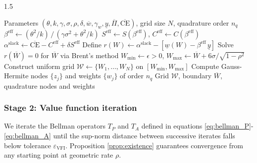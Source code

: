 \documentclass[12pt]{article}
\theoremstyle{definition}
\theoremstyle{plain}
\begin{document}
\begin{spacing}{1.5}
\begin{algorithm}[H]
\caption{Grid construction and regime identification}
\label{alg:grid}
\begin{algorithmic}[1]
\Require Parameters $(\theta, k, \gamma, \sigma, \rho, \delta,
         \overline{w}, \gamma_{w}, \underline{y},
         \overline{\Pi}, \overline{\text{CE}})$, grid size $N$,
         quadrature order $n_{q}$
\State $\beta^{\mathrm{eff}}
       \leftarrow (\theta^{2}/k)\,/\,(\gamma\sigma^{2}+\theta^{2}/k)$
\State $S^{\mathrm{eff}} \leftarrow S(\beta^{\mathrm{eff}})$,
       \quad $C^{\mathrm{eff}} \leftarrow C(\beta^{\mathrm{eff}})$
\State $\alpha^{\mathrm{slack}}
       \leftarrow \overline{\text{CE}} - C^{\mathrm{eff}} + \delta S^{\mathrm{eff}}$
\State Define $r(W)
       \leftarrow \alpha^{\mathrm{slack}}
       - [\underline{w}(W) - \beta^{\mathrm{eff}}\,\underline{y}]$
\State Solve $r(\overline{W}) = 0$ for $\overline{W}$ via Brent's method
\State $W_{\min} \leftarrow \epsilon > 0$,\quad
       $W_{\max} \leftarrow \overline{W}
       + 6\sigma/\!\sqrt{1-\rho^{2}}$
\State Construct uniform grid
       $\mathcal{W} \leftarrow \{W_{1}, \ldots, W_{N}\}$
       on $[W_{\min}, W_{\max}]$
\State Compute Gauss-Hermite nodes $\{z_{j}\}$ and weights $\{w_{j}\}$
       of order $n_{q}$
\Ensure Grid $\mathcal{W}$, boundary $\overline{W}$,
        quadrature nodes and weights
\end{algorithmic}
\end{algorithm}
 

 
\subsubsection*{Stage 2: Value function iteration}
 
We iterate the Bellman operators $T_{P}$ and $T_{A}$ defined in equations \eqref{eq:bellman_P}-\eqref{eq:bellman_A} until the sup-norm distance between successive iterates falls below tolerance $\varepsilon_{\mathrm{VFI}}$. Proposition \ref{prop:existence} guarantees convergence from any starting point at geometric rate $\rho$.
 

\end{spacing}
\end{document}
